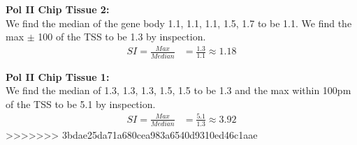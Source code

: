 \documentclass[10pt]{article} %
\begin{document}
\textbf{Pol II Chip Tissue 2:}\\
We find the median of the gene body {1.1, 1.1, 1.1, 1.5, 1.7} to be 1.1.
We find the max $\pm$ 100 of the TSS to be 1.3 by inspection.\\
\begin{align*}
  SI = \frac{Max}{Median} &= \frac{1.3}{1.1} \approx 1.18
\end{align*}

\textbf{Pol II Chip Tissue 1:}\\
We find the median of {1.3, 1.3, 1.3, 1.5, 1.5} to be 1.3 and the max within 100pm of
the TSS to be 5.1 by inspection.\\
\begin{align*}
  SI = \frac{Max}{Median} &= \frac{5.1}{1.3} \approx 3.92
\end{align*}
>>>>>>> 3bdae25da71a680cea983a6540d9310ed46c1aae
\end{document}

